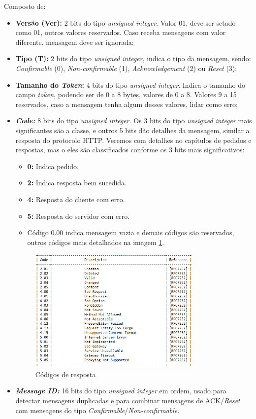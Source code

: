 Composto de: 
\begin{itemize}
	\item \textbf{Versão (Ver):} 2 bits do tipo  \textit{unsigned integer}. Valor 01, deve ser setado como 01, outros valores reservados. Caso receba mensagens com valor diferente, mensagem deve ser ignorada;
	\item \textbf{Tipo (T):} 2 bits do tipo  \textit{unsigned integer}, indica o tipo da mensagem, sendo: \textit{Confirmable} (0), \textit{Non-confirmable} (1), \textit{Acknowledgement} (2) ou \textit{Reset} (3);
	\item \textbf{Tamanho do \textit{Token}:} 4 bits do tipo  \textit{unsigned integer}. Indica o tamanho do campo \textit{token}, podendo ser de 0 a 8 bytes, valores de 0 a 8. Valores 9 a 15 reservados, caso a mensagem tenha algum desses valores, lidar como erro;
	\item \textbf{\textit{Code:}} 8 bits do tipo  \textit{unsigned integer}. Os 3 bits do tipo  \textit{unsigned integer} mais significantes são a classe, e outros 5 bits dão detalhes da mensagem, similar a resposta do protocolo HTTP. Veremos com detalhes no capítulos de pedidos e respostas, mas o eles são classificados conforme os 3 bits mais significativos:
	\begin{itemize}
		\item \textbf{0: } Indica pedido.
		\item \textbf{2: } Indica resposta bem sucedida.
		\item \textbf{4: } Resposta do cliente com erro.
		\item \textbf{5: } Resposta do servidor com erro.
		\item Código 0.00 indica mensagem vazia e demais códigos são reservados, outros códigos mais detalhados na imagem \ref{fig:cod_resp}. %
	\end{itemize}
	\begin{figure}[!htb]
		\centering
		\includegraphics[width=0.8\textwidth]{CODE_RESPOSTAS}
		\caption{Códigos de resposta}
		\label{fig:cod_resp}
	\end{figure}
	\item \textit{\textbf{Message ID:}} 16 bits do tipo \textit{unsigned integer} em ordem, usado para detectar mensagens duplicadas e para combinar mensagens de ACK/\textit{Reset} com mensagens do tipo \textit{Confirmable}/\textit{Non-confirmable}.
\end{itemize}

